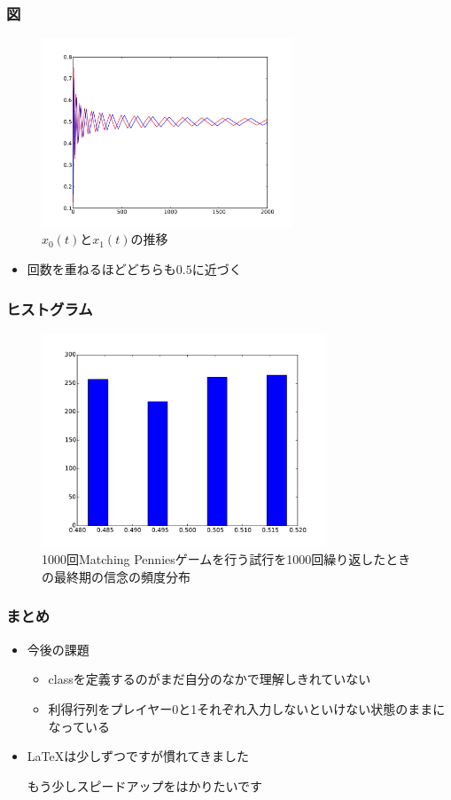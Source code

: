 \documentclass[dvipdfmx,fleqn,jsarticle]{beamer}
\begin{document}
\begin{frame}

\frametitle{図}
\begin{figure}
 \centering
 \includegraphics[width=7.5cm]{fictitious.pdf}
 \caption{$x_0(t)$と$x_1(t)$の推移}
 \label{fig:fictitious plot}
 
\end{figure}
\begin{itemize}\setlength{\parskip}{0.5em}
\item
回数を重ねるほどどちらも$0.5$に近づく
\end{itemize}
\end{frame}




\begin{frame}
\frametitle{ヒストグラム}
\begin{figure}
 \centering
 \includegraphics[width=8.5cm]{fictitious_hist.pdf}
 \caption{1000回Matching Penniesゲームを行う試行を1000回繰り返したときの最終期の信念の頻度分布}
 \label{fig:histgram}
\end{figure}
\end{frame}


\begin{frame}
\frametitle{まとめ}
\begin{itemize}\setlength{\parskip}{0.5em}


\item
今後の課題
 \begin{itemize}\setlength{\parskip}{0.5em}
 \item
classを定義するのがまだ自分のなかで理解しきれていない
 \item
利得行列をプレイヤー0と1それぞれ入力しないといけない状態のままになっている

 \end{itemize}
\item
\LaTeX は少しずつですが慣れてきました

もう少しスピードアップをはかりたいです



\end{itemize}
\end{frame}
\end{document}
